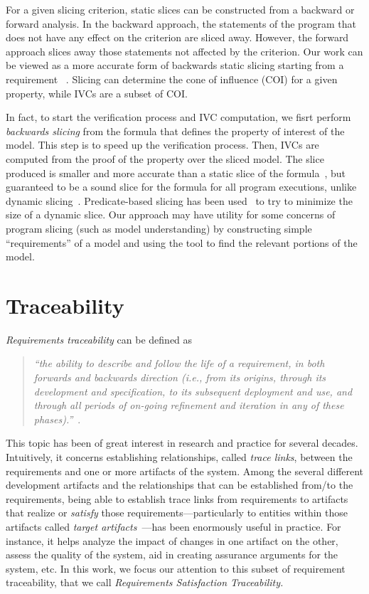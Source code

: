 For a given slicing criterion, static slices can be constructed from a backward or forward analysis. In the backward approach, the statements of the program that does not have any effect on the criterion are sliced away. However, the forward approach slices away those statements not affected by the criterion.
Our work can be viewed as a more accurate form of backwards static slicing starting from a requirement ~\cite{Tip95asurvey}. Slicing can determine the cone of influence (COI) for a given property, while IVCs are a subset of COI.

In fact, to start the verification process and IVC computation, we fisrt perform {\em backwards slicing} from the formula that defines the property of interest of the model. This step is to speed up the verification process.
 Then, IVCs are computed from the proof of the property over the sliced model.  The slice produced is smaller and more accurate than a static slice of the formula~\cite{Weiser:1981:slicing}, but guaranteed to be a sound slice for the formula for all program executions, unlike dynamic slicing~\cite{Agrawal:1990:slicing}.  Predicate-based slicing has been used~\cite{Li04:slicing} to try to minimize the size of a dynamic slice.  Our approach may have utility for some concerns of program slicing (such as model understanding) by constructing simple ``requirements'' of a model and using the tool to find the relevant portions of the model.

\section{Traceability}
\emph{Requirements traceability} can be defined as

\begin{quotation}
\textit{``the ability to describe and follow the life of a requirement, in both forwards and backwards direction (i.e., from its origins, through its development and specification, to its subsequent deployment and use, and through all periods of on-going refinement and iteration in any of these phases).''}~\cite{gotel}.
\end{quotation}

This topic has been of great interest in research and practice for several decades. Intuitively, it concerns establishing relationships, called \emph{trace links}, between the requirements and one or more artifacts of the system.
Among the several different development artifacts and the relationships that can be established from/to the requirements, being able to establish trace links from requirements to artifacts that realize or \emph{satisfy} those requirements---particularly
to entities within those artifacts called \emph{target artifacts}~\cite{gotel2012traceability}---has been enormously useful in practice. For instance, it helps analyze the impact of changes in one artifact on the other, assess the quality of the system, aid in creating assurance arguments for the system, etc. In this work, we focus our attention to this subset of requirement traceability, that we call \emph{Requirements Satisfaction Traceability.}


